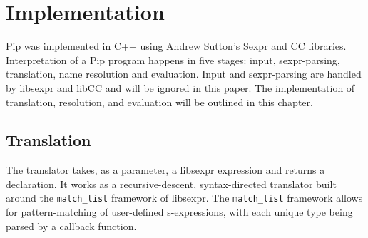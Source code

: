 \section{Implementation}

Pip was implemented in C++ using Andrew Sutton's Sexpr and CC libraries. Interpretation of a Pip program happens in five stages: input, sexpr-parsing, translation, name resolution and evaluation. Input and sexpr-parsing are handled by libsexpr and libCC and will be ignored in this paper. The implementation of translation, resolution, and evaluation will be outlined in this chapter.

\subsection{Translation}
The translator takes, as a parameter, a libsexpr expression and returns a declaration. It works as a recursive-descent, syntax-directed translator built around the \texttt{match\_list} framework of libsexpr. The \texttt{match\_list} framework allows for pattern-matching of user-defined s-expressions, with each unique type being parsed by a callback function.

